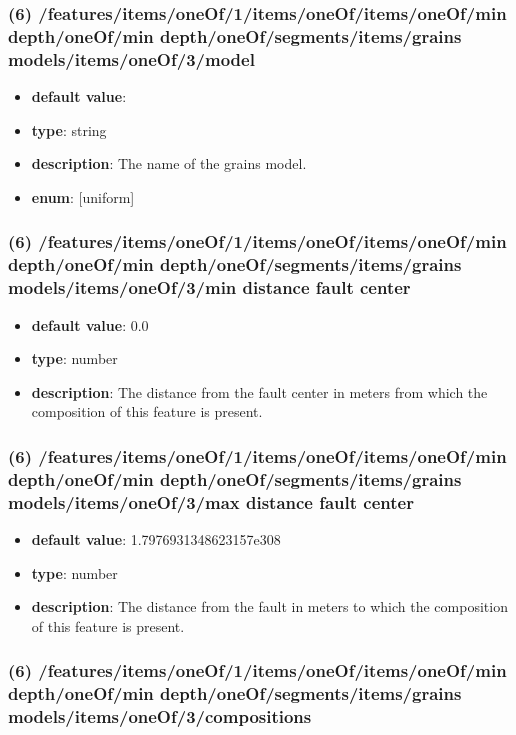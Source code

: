 \subsubsection{(6) /features/items/oneOf/1/items/oneOf/items/oneOf/min depth/oneOf/min depth/oneOf/segments/items/grains models/items/oneOf/3/model}
\begin{itemize}[leftmargin=6em]\item {\bf default value}: 
\item {\bf type}: string
\item {\bf description}: The name of the grains model.
\item {\bf enum}: [uniform]\end{itemize}\subsubsection{(6) /features/items/oneOf/1/items/oneOf/items/oneOf/min depth/oneOf/min depth/oneOf/segments/items/grains models/items/oneOf/3/min distance fault center}
\begin{itemize}[leftmargin=6em]\item {\bf default value}: 0.0
\item {\bf type}: number
\item {\bf description}: The distance from the fault center in meters from which the composition of this feature is present.
\end{itemize}\subsubsection{(6) /features/items/oneOf/1/items/oneOf/items/oneOf/min depth/oneOf/min depth/oneOf/segments/items/grains models/items/oneOf/3/max distance fault center}
\begin{itemize}[leftmargin=6em]\item {\bf default value}: 1.7976931348623157e308
\item {\bf type}: number
\item {\bf description}: The distance from the fault in meters to which the composition of this feature is present.
\end{itemize}\subsubsection{(6) /features/items/oneOf/1/items/oneOf/items/oneOf/min depth/oneOf/min depth/oneOf/segments/items/grains models/items/oneOf/3/compositions}
